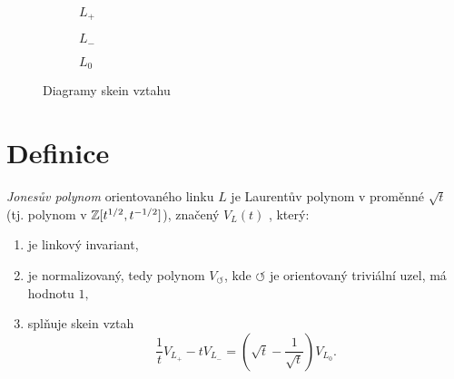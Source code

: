 \begin{figure}[h]  
\centering 
\begin{subfigure}[t]{0.4\linewidth}\centering
{} 
\caption{$L_+$} 
\end{subfigure}
\begin{subfigure}[t]{0.4\linewidth}\centering
{}  
\caption{$L_-$}
\end{subfigure}
\begin{subfigure}[t]{0.4\linewidth}\centering
{}
\caption{$L_0$}
\end{subfigure}
\caption{Diagramy skein vztahu}
\end{figure}

\section{Definice}

\begin{definice}\label{def01:1}
\emph{Jonesův polynom} orientovaného linku $L$ je Laurentův polynom v proměnné $\sqrt t$ (tj. polynom v $\mathbb{Z}[t^{1/2}, t^{-1/2}]$), značený $V_L(t)$ , který:
\begin{enumerate}
\item
je linkový invariant,
\item 
  je normalizovaný, tedy polynom  $V_\circlearrowleft$, kde $\circlearrowleft$ je orientovaný triviální uzel, má hodnotu $1,$
\item  
splňuje skein vztah 
$$ \frac{1}{t} V_{L_+} - t V_{L_-} = (\sqrt{t}  - \frac{1}{\sqrt{t}}) V_{L_0}.$$
\end{enumerate}
\end{definice}

